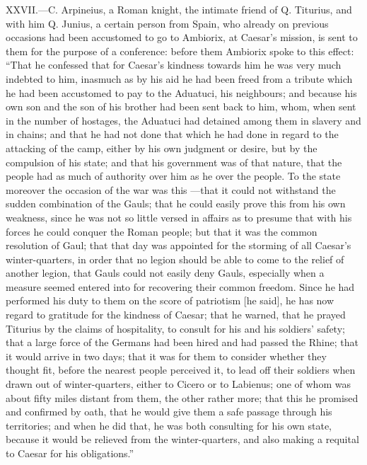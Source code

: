 XXVII.—C. Arpineius, a Roman knight, the intimate friend of Q.
Titurius, and with him Q. Junius, a certain person from Spain, who
already on previous occasions had been accustomed to go to Ambiorix, at
Caesar's mission, is sent to them for the purpose of a conference:
before them Ambiorix spoke to this effect: ``That he confessed that for
Caesar's kindness towards him he was very much indebted to him, inasmuch
as by his aid he had been freed from a tribute which he had been
accustomed to pay to the Aduatuci, his neighbours; and because his own
son and the son of his brother had been sent back to him, whom, when
sent in the number of hostages, the Aduatuci had detained among them in
slavery and in chains; and that he had not done that which he had done
in regard to the attacking of the camp, either by his own judgment or
desire, but by the compulsion of his state; and that his government was
of that nature, that the people had as much of authority over him as he
over the people. To the state moreover the occasion of the war was this
—that it could not withstand the sudden combination of the Gauls; that
he could easily prove this from his own weakness, since he was not so
little versed in affairs as to presume that with his forces he could
conquer the Roman people; but that it was the common resolution of Gaul;
that that day was appointed for the storming of all Caesar's
winter-quarters, in order that no legion should be able to come to the
relief of another legion, that Gauls could not easily deny Gauls,
especially when a measure seemed entered into for recovering their common
freedom. Since he had performed his duty to them on the score of patriotism
[he said], he has now regard to gratitude for the kindness of Caesar; that
he warned, that he prayed Titurius by the claims of hospitality, to
consult for his and his soldiers' safety; that a large force of the
Germans had been hired and had passed the Rhine; that it would arrive in
two days; that it was for them to consider whether they thought fit,
before the nearest people perceived it, to lead off their soldiers when
drawn out of winter-quarters, either to Cicero or to Labienus; one of
whom was about fifty miles distant from them, the other rather more;
that this he promised and confirmed by oath, that he would give them a
safe passage through his territories; and when he did that, he was both
consulting for his own state, because it would be relieved from the
winter-quarters, and also making a requital to Caesar for his
obligations.''

